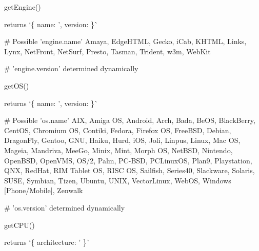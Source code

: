 \begin{DoxyItemize}
\item {\ttfamily get\+Engine()}
\begin{DoxyItemize}
\item returns `\{ name\+: '\textquotesingle{}, version\+: \textquotesingle{}\textquotesingle{} \}\`{}
\end{DoxyItemize}
\end{DoxyItemize}


\begin{DoxyCode}
# Possible 'engine.name'
Amaya, EdgeHTML, Gecko, iCab, KHTML, Links, Lynx, NetFront, NetSurf, Presto, 
Tasman, Trident, w3m, WebKit

# 'engine.version' determined dynamically
\end{DoxyCode}



\begin{DoxyItemize}
\item {\ttfamily get\+O\+S()}
\begin{DoxyItemize}
\item returns `\{ name\+: '\textquotesingle{}, version\+: \textquotesingle{}\textquotesingle{} \}\`{}
\end{DoxyItemize}
\end{DoxyItemize}


\begin{DoxyCode}
# Possible 'os.name'
AIX, Amiga OS, Android, Arch, Bada, BeOS, BlackBerry, CentOS, Chromium OS, Contiki,
Fedora, Firefox OS, FreeBSD, Debian, DragonFly, Gentoo, GNU, Haiku, Hurd, iOS, 
Joli, Linpus, Linux, Mac OS, Mageia, Mandriva, MeeGo, Minix, Mint, Morph OS, NetBSD, 
Nintendo, OpenBSD, OpenVMS, OS/2, Palm, PC-BSD, PCLinuxOS, Plan9, Playstation, QNX, RedHat, 
RIM Tablet OS, RISC OS, Sailfish, Series40, Slackware, Solaris, SUSE, Symbian, Tizen, 
Ubuntu, UNIX, VectorLinux, WebOS, Windows [Phone/Mobile], Zenwalk

# 'os.version' determined dynamically
\end{DoxyCode}



\begin{DoxyItemize}
\item {\ttfamily get\+C\+P\+U()}
\begin{DoxyItemize}
\item returns `\{ architecture\+: '\textquotesingle{} \}\`{}
\end{DoxyItemize}
\end{DoxyItemize}


